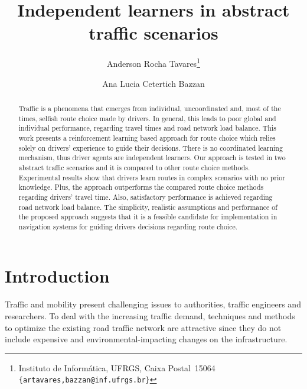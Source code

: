 \documentclass{RITA}
\title{Independent learners in abstract traffic scenarios}
\author{
  Anderson Rocha Tavares\footnote{Instituto de Inform\'atica, UFRGS, Caixa Postal~15064\\
  \texttt{\{artavares,bazzan@inf.ufrgs.br\}}}
  \and Ana Lucia Cetertich Bazzan\footnotemark[1]
}
\begin{document}
\maketitle

\begin{abstract}
Traffic is a phenomena that emerges from individual, uncoordinated and, most of the times, selfish route choice made by drivers. In general, this leads to poor global and individual performance, regarding travel times and road network load balance. This work presents a reinforcement learning based approach for route choice which relies solely on drivers' experience to guide their decisions. 
There is no coordinated learning mechanism, thus driver agents are independent learners. Our approach is tested in two abstract traffic scenarios and it is compared to other route choice methods. 
Experimental results show that drivers learn routes in complex scenarios with no prior knowledge. Plus, the approach outperforms the compared route choice methods regarding drivers' travel time. Also, satisfactory performance is achieved regarding road network load balance. 
The simplicity, realistic assumptions and performance of the proposed approach suggests that it is a feasible candidate for implementation in navigation systems for guiding drivers decisions regarding route choice.
\end{abstract}




\section{Introduction}
\label{sec:intro}

Traffic and mobility present challenging issues to authorities, traffic engineers and researchers. To deal with the increasing traffic demand, techniques and methods to optimize the existing road traffic network are attractive since they do not include expensive and environmental-impacting changes on the infrastructure.
\end{document}
